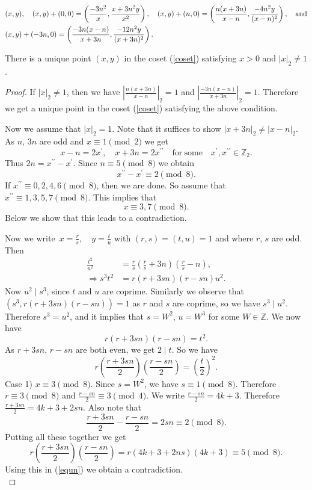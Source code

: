 \documentclass[10pt,a4paper]{amsart}
\newcommand{\Z}{ {\mathbb{Z}} }
\begin{document}
\begin{align}\label{coset}
&(x,y),\quad (x,y)+(0,0)=\left(\frac{-3n^{2}}{x},\frac{x+3n^{2}y}{x^{2}}\right),   \quad (x,y)+(n,0)=\left(\frac{n(x+3n)}{x-n},\frac{-4n^{2}y}{(x-n)^{2}}\right), \quad \text{and}\\&(x,y)+(-3n,0)=\left(\frac{-3n(x-n)}{x+3n},\frac{-12n^{2}y}{(x+3n)^{2}}\right) \notag.
\end{align} 

\begin{lemma}\label{important lemma}
There is a unique point $(x,y)$ in the coset (\ref{coset}) satisfying $x>0$ and $|x|_{2}\neq 1$.    
\end{lemma}

\begin{proof}
If $|x|_{2}\neq 1$, then we have $|\frac{n(x+3n)}{x-n}|_{2}=1$ and $|\frac{-3n(x-n)}{x+3n}|_{2}=1$. Therefore we get a unique point in the coset (\ref{coset}) satisfying the above condition. 

\noindent Now we assume that $|x|_{2}=1$. Note that it suffices to show $|x+3n|_{2}\neq |x-n|_{2}$. As $n$, $3n$ are odd and $x\equiv 1\pmod{2}$ we get
$$x-n=2x^{\prime}, \quad x+3n=2x^{\prime \prime} \quad \mathrm{for\: some} \quad x^{\prime},x^{\prime \prime}\in \mathbb{Z}_{2}.$$ Thus $2n=x^{\prime \prime}-x^{\prime}$. Since $n\equiv 5\pmod{8}$ we obtain
$$x^{\prime \prime}-x^{\prime}\equiv 2\pmod{8}.$$
If $x^{\prime\prime}\equiv 0,2,4,6\pmod{8}$, then we are done. So  assume that $x^{\prime\prime}\equiv 1,3,5,7\pmod{8}$. This implies that $$x\equiv 3,7\pmod{8}.$$
Below we show that this leads to a contradiction.


\noindent Now we write $\, x=\frac{r}{s},\quad y=\frac{t}{u}$ with $(r,s)=(t,u)=1$ and where $r$, $s$ are odd. Then
\begin{align*}
\frac{t^{2}}{u^{2}}  & =\frac{r}{s}(\frac{r}{s}+3n)(\frac{r}{s}-n), \\ 
\Rightarrow s^{3}t^{2} &  =r(r+3sn)(r-sn)u^{2}.
\end{align*}
Now $u^{2}\mid s^{3}$, since $t$ and $u$ are coprime. Similarly we observe that $(s^{3}, r(r+3sn)(r-sn))=1$ as $r$ and $s$ are coprime, so we have $s^{3}\mid u^{2}$. Therefore $s^{3}=u^{2}$, and it implies that $s=W^{2}$, $u=W^{3}$ for some $W \in \Z$. We now have $$r(r+3sn)(r-sn)=t^{2}.$$ 
As $r+3sn$, $r-sn$ are both even, we get $2\mid t$. So we have
\begin{equation}\label{equn}
r\left(\frac{r+3sn}{2}\right)\left(\frac{r-sn}{2}\right)=\left(\frac{t}{2}\right)^{2}.    
\end{equation}
Case 1)  $x\equiv 3\pmod{8}$. Since $s=W^{2}$, we have $s\equiv 1\pmod{8}$. Therefore $r\equiv 3\pmod{8}$ and $\frac{r-sn}{2}\equiv 3\pmod{4}$. We write $\frac{r-sn}{2}=4k+3$. Therefore $\frac{r+3sn}{2}=4k+3+2sn$. Also note that
$$\frac{r+3sn}{2}-\frac{r-sn}{2}=2sn\equiv 2\pmod{8}.$$
Putting all these together we get
$$r\left(\frac{r+3sn}{2}\right)\left(\frac{r-sn}{2}\right)=r(4k+3+2ns)(4k+3)\equiv 5\pmod{8}.$$
Using this in (\ref{equn}) we obtain a contradiction.\\


\end{proof}
\end{document}
